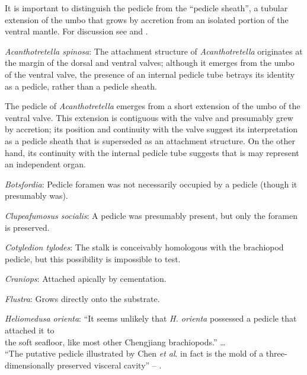 \documentclass[openany]{book}
\theoremstyle{definition}
\theoremstyle{definition}
\theoremstyle{definition}
\theoremstyle{remark}
\begin{document}
It is important to distinguish the pedicle from the ``pedicle sheath'',
a tubular extension of the umbo that grows by accretion from an isolated
portion of the ventral mantle. For discussion see
\citet{Holmer2018Theattachment} and \citet{Bassett2017Earliestontogeny}.

\hypertarget{Acanthotretella_spinosa-coding-21}{}
\emph{Acanthotretella spinosa}: The attachment structure of
\emph{Acanthotretella} originates at the margin of the dorsal and
ventral valves; although it emerges from the umbo of the ventral valve,
the presence of an internal pedicle tube betrays its identity as a
pedicle, rather than a pedicle sheath.

The pedicle of \emph{Acanthotretella} emerges from a short extension of
the umbo of the ventral valve. This extension is contiguous with the
valve and presumably grew by accretion; its position and continuity with
the valve suggest its interpretation as a pedicle sheath that is
superseded as an attachment structure. On the other hand, its continuity
with the internal pedicle tube suggests that is may represent an
independent organ.

\hypertarget{Botsfordia-coding-21}{}
\emph{Botsfordia}: Pedicle foramen was not necessarily occupied by a
pedicle (though it presumably was).

\hypertarget{Clupeafumosus_socialis-coding-21}{}
\emph{Clupeafumosus socialis}: A pedicle was presumably present, but
only the foramen is preserved.

\hypertarget{Cotyledion_tylodes-coding-21}{}
\emph{Cotyledion tylodes}: The stalk is conceivably homologous with the
brachiopod pedicle, but this possibility is impossible to test.

\hypertarget{Craniops-coding-21}{}
\emph{Craniops}: Attached apically by cementation.

\hypertarget{Flustra-coding-21}{}
\emph{Flustra}: Grows directly onto the substrate.

\hypertarget{Heliomedusa_orienta-coding-21}{}
\emph{Heliomedusa orienta}: ``It seems unlikely that \emph{H. orienta}
possessed a pedicle that attached it to\\
the soft seafloor, like most other Chengjiang brachiopods.'' \ldots{}\\
``The putative pedicle illustrated by Chen \emph{et al}.
\citeyearpar[Figs 4, 6, 7]{Chen2007Reinterpretationof} in fact is the
mold of a three-dimensionally preserved visceral cavity'' --
\citet{Zhang2009Architectureand}.
\end{document}
